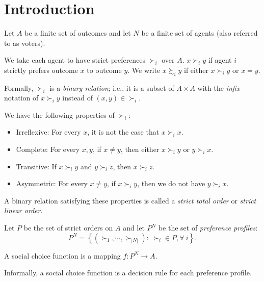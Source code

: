 
\section{Introduction}
\begin{notation}
	Let $A$ be a finite set of outcomes and let $N$ be a finite set of agents (also referred to as voters).

	We take each agent to have strict preferences $\succ_i$ over $A$. 
	$x \succ_i y$ if agent $i$ strictly prefers outcome $x$ to outcome $y$. We write $x \succsim_i y$ if either $x \succ_i y$ or $x = y$.
	
\end{notation}
Formally, $\succ_i$ is a \emph{binary relation}; i.e., it is a subset of $A \times A$ with the \emph{infix} notation of $x \succ_i y$ instead of $\left( x,y \right) \in \succ_i$.
\begin{remark}
	We have the following properties of $\succ_i$:
	\begin{itemize}
		\item Irreflexive: For every $x$, it is not the case that $x \succ_i x$.
		\item Complete: For every $x,y$, if $x \ne y$, then either $x \succ_i y$ or $y \succ_i x$.
		\item Transitive: If $x \succ_i y$ and $y \succ_i z$, then $x \succ_i z$.
		\item Asymmetric: For every $x \ne y$, if $x \succ_i y$, then we do not have $y \succ_i x$.
	\end{itemize}

	A binary relation satisfying these properties is called a \emph{strict total order} or \emph{strict linear order}.
\end{remark}

Let $P$ be the set of strict orders on $A$ and let $P^N$ be the set of \emph{preference profiles}: \[
	P^N = \left\{\left( \succ_1, \cdots, \succ_{\left| N \right|} \right):\ \succ_i \in P, \forall\ i\right\}
.\] 

\begin{definition}
	A social choice function is a mapping $f: P^N \to A$.
\end{definition}
Informally, a social choice function is a decision rule for each preference profile.

